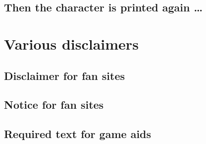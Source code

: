 \documentclass{article}
\begin{document}
\subsection{Then the character is printed again \ldots{}}
\label{sec:then-char-prepr}



\section{Various disclaimers}
\label{sec:various-disclaimers}

\subsection{Disclaimer for fan sites}
\label{sec:disclaimer-fan-sites}

\SJGamesOnlinePolicyDisclaimer

\subsection{Notice for fan sites}
\label{sec:disclaimer-fan-sites}

\SJGamesOnlinePolicyNotice

\subsection{Required text for game aids}
\label{sec:disclaimer-fan-sites}

\end{document}
